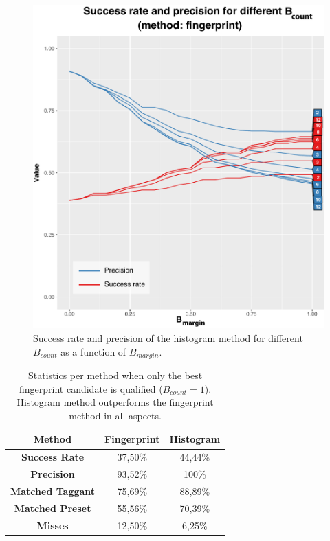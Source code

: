\documentclass[thesis.tex]{subfiles}
\begin{document}
\begin{figure}[h]
\centering \includegraphics[page=2,width=\textwidth,height=\textheight,keepaspectratio=true]{images/experiment/match_precision}
\vspace{-9mm}
\caption{Success rate and precision of the histogram method for different $B_{count}$ as a function of $B_{margin}$.}
\label{figure:match_precision_histogram}
\end{figure}

\clearpage

\begin{table}[b]
  \caption{Statistics per method when only the best fingerprint candidate is qualified ($B_{count} = 1$). Histogram method outperforms the fingerprint method in all aspects.}
  \label{table:match_precision_count1}

  \begin{center}
  \begin{tabular}{| c | c | c |}
    \hline
    \textbf{Method} & Fingerprint & Histogram \\
    \hline
    \textbf{Success Rate} & 37,50\% & 44,44\% \\
    \hline
    \textbf{Precision} & 93,52\% & 100\% \\
    \hline
    \textbf{Matched Taggant} & 75,69\% & 88,89\% \\
    \hline
    \textbf{Matched Preset} & 55,56\% & 70,39\% \\
    \hline
    \textbf{Misses} & 12,50\% & 6,25\% \\
    \hline
  \end{tabular}
  \end{center}
\end{table}
\end{document}
